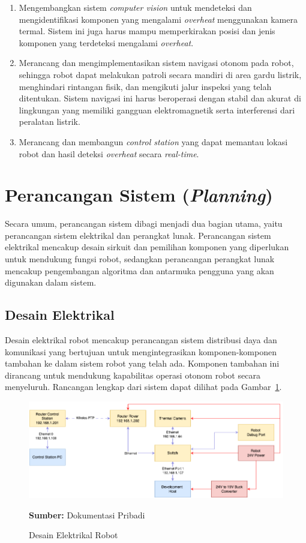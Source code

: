 \begin{enumerate}
  \item Mengembangkan sistem \emph{computer vision} untuk mendeteksi dan mengidentifikasi komponen yang mengalami \emph{overheat} menggunakan kamera termal. Sistem ini juga harus mampu memperkirakan posisi dan jenis komponen yang terdeteksi mengalami \emph{overheat}.
  \item Merancang dan mengimplementasikan sistem navigasi otonom pada robot, sehingga robot dapat melakukan patroli secara mandiri di area gardu listrik, menghindari rintangan fisik, dan mengikuti jalur inspeksi yang telah ditentukan. Sistem navigasi ini harus beroperasi dengan stabil dan akurat di lingkungan yang memiliki gangguan elektromagnetik serta interferensi dari peralatan listrik.
  \item Merancang dan membangun \emph{control station} yang dapat memantau lokasi robot dan hasil deteksi \emph{overheat} secara \emph{real-time}.
\end{enumerate}


\section{Perancangan Sistem (\emph{Planning})}
Secara umum, perancangan sistem dibagi menjadi dua bagian utama, yaitu perancangan sistem elektrikal dan perangkat lunak. Perancangan sistem elektrikal mencakup desain sirkuit dan pemilihan komponen yang diperlukan untuk mendukung fungsi robot, sedangkan perancangan perangkat lunak mencakup pengembangan algoritma dan antarmuka pengguna yang akan digunakan dalam sistem.

\subsection{Desain Elektrikal}

Desain elektrikal robot mencakup perancangan sistem distribusi daya dan komunikasi yang bertujuan untuk mengintegrasikan komponen-komponen tambahan ke dalam sistem robot yang telah ada. Komponen tambahan ini dirancang untuk mendukung kapabilitas operasi otonom robot secara menyeluruh. Rancangan lengkap dari sistem dapat dilihat pada Gambar~\ref{fig:electrical}.

\begin{figure}[H]
  \centering
  \includegraphics[width=1\textwidth]{gambar/bab3/electrical.png}
  \caption{Desain Elektrikal Robot}
  \label{fig:electrical}
  \footnotesize{\textbf{Sumber:} Dokumentasi Pribadi}
\end{figure}

